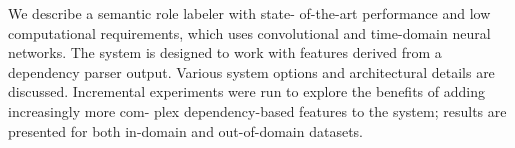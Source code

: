 We describe a semantic role labeler with state- of-the-art performance and low computational requirements, which uses convolutional and time-domain neural networks. The system is designed to work with features derived from a dependency parser output. Various system options and architectural details are discussed. Incremental experiments were run to explore the benefits of adding increasingly more com- plex dependency-based features to the system; results are presented for both in-domain and out-of-domain datasets.
